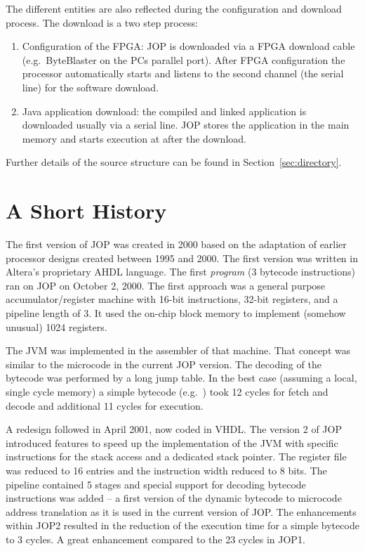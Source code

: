 The different entities are also reflected during the configuration
and download process. The download is a two step process:
\begin{enumerate}
    \item Configuration of the FPGA: JOP is downloaded via a
    FPGA download cable (e.g.\ ByteBlaster on the PCs parallel
    port). After FPGA configuration the processor automatically starts and
    listens to the second channel (the serial line) for the software download.
    \item Java application download: the compiled and linked
    application is downloaded usually via a serial line. JOP stores
    the application in the main memory and starts execution at
     after the download.
\end{enumerate}

Further details of the source structure can be found in
Section~\ref{sec:directory}.

\section{A Short History}

The first version of JOP was created in 2000 based on the adaptation
of earlier processor designs created between 1995 and 2000. The first
version was written in Altera's proprietary AHDL language. The first
\emph{program} (3 bytecode instructions) ran on JOP on October 2,
2000. The first approach was a general purpose accumulator/register
machine with 16-bit instructions, 32-bit registers, and a pipeline
length of 3. It used the on-chip block memory to implement (somehow
unusual) 1024 registers.

The JVM was implemented in the assembler of that machine. That
concept was similar to the microcode in the current JOP version. The
decoding of the bytecode was performed by a long jump table. In the
best case (assuming a local, single cycle memory) a simple bytecode
(e.g.\ ) took 12 cycles for fetch and decode and
additional 11 cycles for execution.


A redesign followed in April 2001, now coded in VHDL. The version 2
of JOP introduced features to speed up the implementation of the JVM
with specific instructions for the stack access and a dedicated stack
pointer. The register file was reduced to 16 entries and the
instruction width reduced to 8 bits. The pipeline contained 5 stages
and special support for decoding bytecode instructions was added -- a
first version of the dynamic bytecode to microcode address
translation as it is used in the current version of JOP. The
enhancements within JOP2 resulted in the reduction of the execution
time for a simple bytecode to 3 cycles. A great enhancement compared
to the 23 cycles in JOP1.


